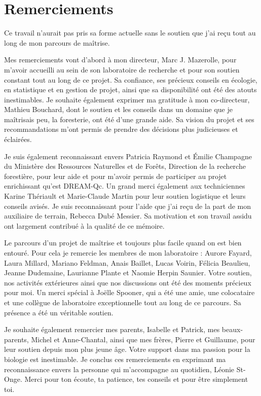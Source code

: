 \chapter*{Remerciements}        %
\label{chap-remerciements}      %


 Ce travail n'aurait pas pris sa forme actuelle sans le soutien que j'ai reçu tout au long de mon parcours de maîtrise.

 Mes remerciements vont d'abord à mon directeur, Marc J. Mazerolle, pour m'avoir accueilli au sein de son laboratoire de recherche et pour son soutien constant tout au long de ce projet. 
 Sa confiance, ses précieux conseils en écologie, en statistique et en gestion de projet, ainsi que sa disponibilité ont été des atouts inestimables.
 Je souhaite également exprimer ma gratitude à mon co-directeur, Mathieu Bouchard, dont le soutien et les conseils dans un domaine que je maîtrisais peu, la foresterie, ont été d'une grande aide. 
 Sa vision du projet et ses recommandations m'ont permis de prendre des décisions plus judicieuses et éclairées.

 Je suis également reconnaissant envers Patricia Raymond et Émilie Champagne du Ministère des Ressources Naturelles et de Forêts, Direction de la recherche forestière, pour leur aide et 
 pour m'avoir permis de participer au projet enrichissant qu'est DREAM-Qc.
 Un grand merci également aux techniciennes Karine Thériault et Marie-Claude Martin pour leur soutien logistique et leurs conseils avisés.
 Je suis reconnaissant pour l'aide que j'ai reçu de la part de mon auxiliaire de terrain, Rebecca Dubé Messier. Sa motivation et son travail assidu ont largement contribué à la qualité de ce mémoire.

 Le parcours d'un projet de maîtrise et toujours plus facile quand on est bien entouré. 
 Pour cela je remercie les membres de mon laboratoire : 
 Aurore Fayard, Laura Millard, Mariano Feldman, Anais Baillet, Lucas Voirin, Félicia Beaulieu, Jeanne Dudemaine, Laurianne Plante et Naomie Herpin Saunier. 
 Votre soutien, nos activités extérieures ainsi que nos discussions ont été des moments précieux pour moi.
 Un merci spécial à Joëlle Spooner, qui a été une amie, une colocataire et une collègue de laboratoire exceptionnelle tout au long de ce parcours. 
 Sa présence a été un véritable soutien.

 Je souhaite également remercier mes parents, Isabelle et Patrick, mes beaux-parents, Michel et Anne-Chantal, ainsi que mes frères, Pierre et Guillaume, pour leur soutien depuis 
 mon plus jeune âge. Votre support dans ma passion pour la biologie est inestimable.
 Je conclus ces remerciements en exprimant ma reconnaissance envers la personne qui m'accompagne au quotidien, Léonie St-Onge. 
 Merci pour ton écoute, ta patience, tes conseils et pour être simplement toi.

